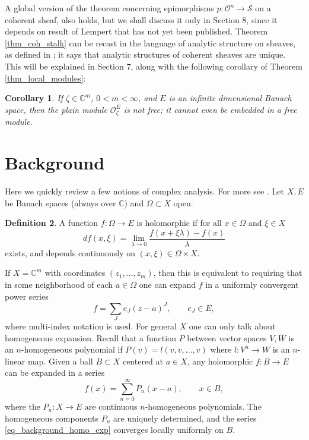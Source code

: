 \documentclass{amsart}
\numberwithin{equation}{section}
\theoremstyle{definition}
\newtheorem{definition}{Definition}[section]
\theoremstyle{plain}
\newtheorem{corollary}[definition]{Corollary}
\theoremstyle{remark}
\begin{document}
A global version of the theorem concerning epimorphisms 
$p:{\ensuremath{\mathcal{{O}}}}^n\rightarrow{\ensuremath{\mathcal{{S}}}}$ on a coherent sheaf, also holds,
but we shall discuss it only in Section 8,
since it depends on result of Lempert that has not yet been published.
Theorem \ref{thm_coh_stalk} can be recast in the language of
analytic structure on sheaves, as defined in \cite{LP};
it says that analytic structures of coherent sheaves are unique.
This will be explained in Section 7, along with the following corollary
of Theorem \ref{thm_local_modules}:
\begin{corollary}\label{cor_non_free}
If $\zeta\in\mathbb{C}^m$, $0<m<\infty$, and $E$ is an infinite dimensional Banach space, then the plain module ${\ensuremath{\mathcal{{O}}}}^E_\zeta$ is not free;
it cannot even be embedded in a free module.
\end{corollary}

\section{Background}
Here we quickly review a few notions of complex analysis. For more see
\cite{GR,mujica,serre}.
Let $X,E$ be Banach spaces (always over $\mathbb{C}$) and $\Omega\subset X$ open.
\begin{definition}
A function $f:\Omega\rightarrow E$ is holomorphic if for all $x\in\Omega$
and $\xi\in X$
\[
df(x,\xi)=\lim_{\lambda\rightarrow 0}\frac{f(x+\xi\lambda)-f(x)}{\lambda}
\]
exists, and depends continuously on $(x,\xi)\in\Omega\times X$.
\end{definition}

If $X=\mathbb{C}^m$ with coordinates $(z_1,\ldots,z_m)$, then this is equivalent
to requiring that in some neighborhood of each $a\in\Omega$ one
can expand $f$ in a uniformly convergent power series 
\[
	f=\sum_J e_J (z-a)^J, \qquad e_J\in E,
\]
where multi-index notation is used. For general $X$ one can only talk about
homogeneous expansion. Recall that a function $P$ between vector spaces $V, W$
is an $n$-homogeneous polynomial if $P(v)=l(v,v,\ldots,v)$ where $l:V^n\rightarrow W$ is an $n$-linear map.
Given a ball $B\subset X$ centered at $a\in X$, any holomorphic $f:B\rightarrow E$ can be expanded in a series
\begin{equation}\label{eq_background_homo_exp}
	f(x)=\sum_{n=0}^\infty P_n(x-a), \qquad x\in B,
\end{equation}
where the $P_n:X\rightarrow E$ are continuous $n$-homogeneous polynomials.
The homogeneous components $P_n$ are uniquely determined, and the series 
\eqref{eq_background_homo_exp} converges locally uniformly on $B$.
\end{document}
